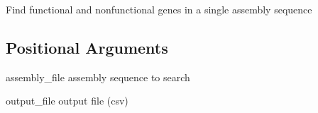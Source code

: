 \documentclass[letterpaper,10pt,english]{sphinxmanual}
\begin{document}
\sphinxAtStartPar

\sphinxAtStartPar
Find functional and nonfunctional genes in a single assembly sequence


\begin{sphinxVerbatim}[commandchars=\\\{\}]
  \PYG{p}{[}\PYG{p}{]} \PYG{p}{[} \PYG{p}{]} \PYG{p}{[} \PYG{p}{]} \PYG{p}{[} \PYG{p}{]} \PYG{p}{[} \PYG{p}{]} \PYG{p}{[} \PYG{p}{]} \PYG{p}{[} \PYG{p}{]} \PYG{p}{[} \PYG{p}{]} \PYG{p}{[} \PYG{p}{]} \PYG{p}{[} \PYG{p}{]} \PYG{p}{[}\PYG{p}{]}
               
\end{sphinxVerbatim}


\subsection{Positional Arguments}
\label{\detokenize{tools/digger:positional-arguments}}\begin{optionlist}{3cm}
\item [assembly\_file]  
\sphinxAtStartPar
assembly sequence to search
\item [output\_file]  
\sphinxAtStartPar
output file (csv)
\end{optionlist}
\end{document}
